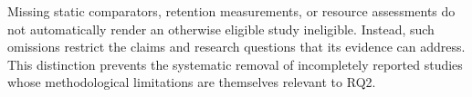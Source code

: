 Missing static comparators, retention measurements,
or resource assessments do not automatically render
an otherwise eligible study ineligible. Instead,
such omissions restrict the claims and research
questions that its evidence can address. This
distinction prevents the systematic removal of
incompletely reported studies whose methodological
limitations are themselves relevant to RQ2.
